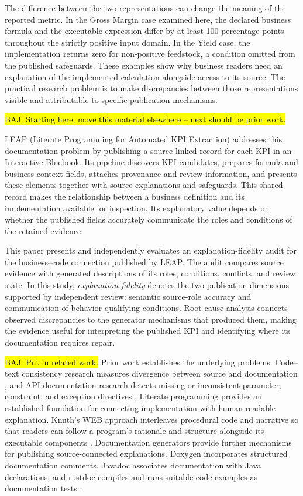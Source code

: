 \documentclass[a4paper,fleqn]{cas-dc}
\newcommand{\baj}[1]{{\sethlcolor{yellow}\hl{BAJ: #1}}}
\begin{document}
The difference between the two representations can change the meaning of the reported metric. In the Gross Margin case examined here, the declared business formula and the executable expression differ by at least 100 percentage points throughout the strictly positive input domain. In the Yield case, the implementation returns zero for non-positive feedstock, a condition omitted from the published safeguards. These examples show why business readers need an explanation of the implemented calculation alongside access to its source. The practical research problem is to make discrepancies between those representations visible and attributable to specific publication mechanisms.

\baj{Starting here, move this material elsewhere -- next should be prior work.}

LEAP (Literate Programming for Automated KPI Extraction) addresses this documentation problem by publishing a source-linked record for each KPI in an Interactive Bluebook. Its pipeline discovers KPI candidates, prepares formula and business-context fields, attaches provenance and review information, and presents these elements together with source explanations and safeguards. This shared record makes the relationship between a business definition and its implementation available for inspection. Its explanatory value depends on whether the published fields accurately communicate the roles and conditions of the retained evidence.

This paper presents and independently evaluates an explanation-fidelity audit for the business--code connection published by LEAP. The audit compares source evidence with generated descriptions of its roles, conditions, conflicts, and review state. In this study, \emph{explanation fidelity} denotes the two publication dimensions supported by independent review: semantic source-role accuracy and communication of behavior-qualifying conditions. Root-cause analysis connects observed discrepancies to the generator mechanisms that produced them, making the evidence useful for interpreting the published KPI and identifying where its documentation requires repair.

\baj{Put in related work.}
Prior work establishes the underlying problems. Code--text consistency research measures divergence between source and documentation \citep{Wen2019,Xu2024,Eghbali2026}, and API-documentation research detects missing or inconsistent parameter, constraint, and exception directives \citep{Zhou2017}. Literate programming provides an established foundation for connecting implementation with human-readable explanation. Knuth's WEB approach interleaves procedural code and narrative so that readers can follow a program's rationale and structure alongside its executable components \citep{Knuth1984}. Documentation generators provide further mechanisms for publishing source-connected explanations. Doxygen incorporates structured documentation comments, Javadoc associates documentation with Java declarations, and rustdoc compiles and runs suitable code examples as documentation tests \citep{DoxygenManual,JavadocGuide,RustdocBook}.
\end{document}
